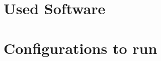 
\section{Used Software}



\section{Configurations to run \mainalgos}
\label{ap:yamls_for_origalgos}


% 

\subsection{\textcite{Derrac2015}}

